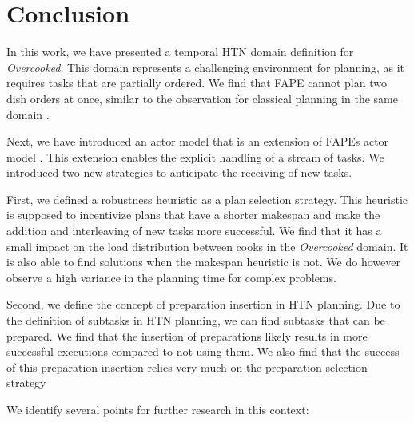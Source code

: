 \section{Conclusion}\label{sec:conclusion}

In this work, we have presented a temporal \ac{HTN} domain definition for \textit{Overcooked}.
This domain represents a challenging environment for planning, as it requires tasks that are partially ordered.
We find that \ac{FAPE} cannot plan two dish orders at once, similar to the observation for classical planning in the same domain \citep{yuxinliuPlanningOvercookedGame2020}.

Next, we have introduced an actor model that is an extension of \ac{FAPE}s actor model \citep{bit-monnotTemporalHierarchicalModels2016a}.
This extension enables the explicit handling of a stream of tasks.
We introduced two new strategies to anticipate the receiving of new tasks.

First, we defined a robustness heuristic as a plan selection strategy.
This heuristic is supposed to incentivize plans that have a shorter makespan and make the addition and interleaving of new tasks more successful.
We find that it has a small impact on the load distribution between cooks in the \textit{Overcooked} domain.
It is also able to find solutions when the makespan heuristic is not.
We do however observe a high variance in the planning time for complex problems.

Second, we define the concept of preparation insertion in \ac{HTN} planning.
Due to the definition of subtasks in \ac{HTN} planning, we can find subtasks that can be prepared.
We find that the insertion of preparations likely results in more successful executions compared to not using them.
We also find that the success of this preparation insertion relies very much on the preparation selection strategy

We identify several points for further research in this context:

